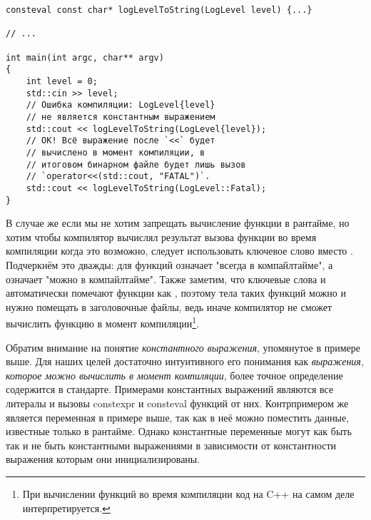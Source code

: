 \begin{verbatim}
consteval const char* logLevelToString(LogLevel level) {...}

// ...

int main(int argc, char** argv)
{
    int level = 0;
    std::cin >> level;
    // Ошибка компиляции: LogLevel{level}
    // не является константным выражением
    std::cout << logLevelToString(LogLevel{level});
    // OK! Всё выражение после `<<` будет
    // вычислено в момент компиляции, в
    // итоговом бинарном файле будет лишь вызов
    // `operator<<(std::cout, "FATAL")`.
    std::cout << logLevelToString(LogLevel::Fatal);
}
\end{verbatim}
В случае же если мы не хотим запрещать вычисление функции в рантайме, но хотим чтобы компилятор вычислял результат вызова функции во время компиляции когда это возможно, следует использовать ключевое слово  вместо . Подчеркнём это дважды: для функций  означает "всегда в компайлтайме", а  означает "можно в компайлтайме". Также заметим, что ключевые слова  и  автоматически помечают функции как , поэтому тела таких функций можно и нужно помещать в заголовочные файлы, ведь иначе компилятор не сможет вычислить функцию в момент компиляции\footnote{При вычислении функций во время компиляции код на C++ на самом деле интерпретируется.}.

Обратим внимание на понятие \textit{константного выражения}, упомянутое в примере выше. Для наших целей достаточно интуитивного его понимания как \textit{выражения, которое можно вычислить в момент компиляции}, более точное определение содержится в стандарте. Примерами константных выражений являются все литералы и вызовы constexpr и consteval функций от них. Контрпримером же является переменная  в примере выше, так как в неё можно поместить данные, известные только в рантайме. Однако константные переменные могут как быть так и не быть константными выражениями в зависимости от константности выражения которым они инициализированы.

